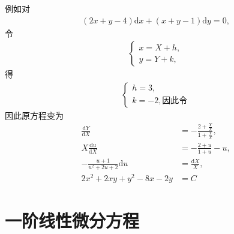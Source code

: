 \documentclass[UTF8,a4paper,11pt]{ctexart}
\begin{document}
    例如对
    \[
    \begin{aligned}
      \left(2x+y-4\right)\mathrm{d}x+\left(x+y-1\right)\mathrm{d}y=0,
    \end{aligned}
    \]
    令
    \[
    \begin{aligned}
      \begin{cases}
        x=X+h,\\y=Y+k,
      \end{cases}
    \end{aligned}
    \]
    得
    \[
    \begin{aligned}
      \begin{cases}
        h=3,\\k=-2,
    因此令
      \end{cases}
    \end{aligned}
    \]
    因此原方程变为
    \[
    \begin{aligned}
      \frac{\mathrm{d}Y}{\mathrm{d}X}&=-\frac{2+\frac{Y}{X}}{1+\frac{Y}{X}},\\
      X \frac{\mathrm{d}u}{\mathrm{d}X}&=-\frac{2+u}{1+u}-u,\\
      -\frac{u+1}{u^{2}+2u+2}\mathrm{d}u&=\frac{\mathrm{d}X}{X},\\
      2x^{2}+2xy+y^{2}-8x-2y&=C
    \end{aligned}
    \]
  \section{一阶线性微分方程}
\end{document}

